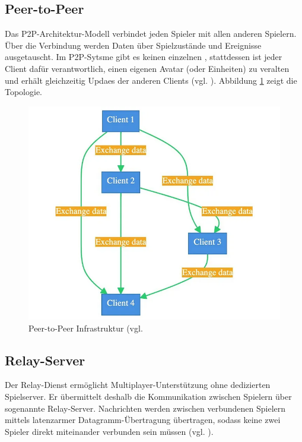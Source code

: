 \subsection{Peer-to-Peer}
Das \ac{P2P}-Architektur-Modell verbindet jeden Spieler mit allen anderen Spielern. Über die Verbindung werden Daten über Spielzustände und Ereignisse ausgetauscht. Im  \ac{P2P}-Sytsme gibt es keinen einzelnen , stattdessen ist jeder Client dafür verantwortlich, einen eigenen Avatar (oder Einheiten) zu veralten und erhält gleichzeitig Updaes der anderen Clients (vgl. \cite{mygames_unity_2024}). Abbildung \ref{fig:p-2-p} zeigt die Topologie.

\begin{figure}[ht]
\centering
\includegraphics[width=1\linewidth]{content/pictures/0_poGQC2fWQ3tPWPwT.png}
\caption{Peer-to-Peer Infrastruktur (vgl. \cite{mygames_unity_2024}}
\label{fig:p-2-p}
\end{figure}


\subsection{Relay-Server}
Der Relay-Dienst ermöglicht Multiplayer-Unterstützung ohne dedizierten Spielserver. Er übermittelt deshalb die Kommunikation zwischen Spielern über sogenannte Relay-Server. Nachrichten werden zwischen verbundenen Spielern mittels latenzarmer Datagramm-Übertragung übertragen, sodass keine zwei Spieler direkt miteinander verbunden sein müssen (vgl. \cite{noauthor_relay_nodate}).

